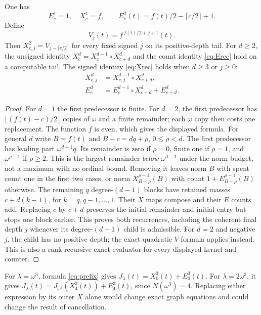 \documentclass[11pt]{article}
\begin{document}
\begin{lemma}\label{lem:kernel-recursion}
One has
\[
 E^1_c=1,\quad X^1_c=f,\qquad
 E^2_c(t)=f(t)/2-\lceil c/2\rceil+1.
\]
Define
\begin{equation}\label{eq:V}
 V_j(t)=f^{\,f(t)/2+j+1}(t).
\end{equation}
Then $X^2_{c,j}=V_{j-\lceil c/2\rceil}$ for every fixed signed $j$ on
its positive-depth tail. For $d\ge2$, the unsigned identity
$X^d_c=X^{d-1}_c\circ X^d_{c+d}$ and the count identity
\eqref{eq:Erec} hold on a computable tail. The signed identity
\eqref{eq:Xrec} holds when $d\ge3$ or $j\ge0$:
\begin{align}
 X^d_{c,j}&=X^{d-1}_{c,j}\circ X^d_{c+d},\label{eq:Xrec}\\
 E^d_c&=E^{d-1}_c\circ X^d_{c+d}+E^d_{c+d}.\label{eq:Erec}
\end{align}
\end{lemma}
\begin{proof}
For $d=1$ the first predecessor is finite. For $d=2$, the first
predecessor has $\lfloor(f(t)-c)/2\rfloor$ copies of $\omega$ and a finite
remainder; each $\omega$ copy then costs one replacement. The function $f$
is even, which gives the displayed formula.
For general $d$ write $B=f(t)$ and $B-c=dq+\rho$, $0\le\rho<d$. The first
predecessor has leading part $\omega^{d-1}q$. Its remainder is zero if
$\rho=0$, finite one if $\rho=1$, and $\omega^{\rho-1}$ if $\rho\ge2$.
This is the largest remainder \emph{below $\omega^{d-1}$} under the norm
budget, not a maximum with no ordinal bound. Removing it leaves norm $B$
with spent count one in the first two cases, or norm
$X^{\rho-1}_{B-\rho}(B)$ with count $1+E^{\rho-1}_{B-\rho}(B)$ otherwise.
The remaining $q$ degree-$(d-1)$ blocks have retained masses
$c+d(k-1)$, for $k=q,q-1,\ldots,1$. Their $X$ maps compose and their $E$
counts add. Replacing $c$ by $c+d$ preserves the initial remainder and
initial entry but stops one block earlier. This proves both recurrences,
including the coherent final depth $j$ whenever its degree-$(d-1)$
child is admissible. For $d=2$ and negative $j$, the child has no positive
depth; the exact quadratic $V$ formula applies instead. This is also a
rank-recursive exact evaluator for every displayed kernel and counter.
\end{proof}

\begin{example}
For $\lambda=\omega^3$, formula \eqref{eq:prefix} gives
$J_\lambda(t)=X^3_0(t)+E^3_0(t)$. For $\lambda=2\omega^3$, it gives
$J_\lambda(t)=J_{\omega^3}(X^3_4(t))+E^3_4(t)$, since
$N(\omega^3)=4$. Replacing either expression by its outer $X$ alone would
change exact graph equations and could change the result of cancellation.
\end{example}
\end{document}
